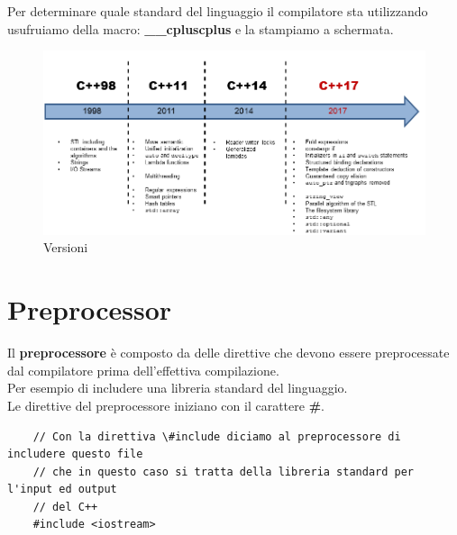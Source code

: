 \textsf{\small Per determinare quale standard del linguaggio il compilatore sta utilizzando usufruiamo della macro: \textbf{\_\_cpluscplus} e la stampiamo a schermata.} \\

\begin{figure}[H]
	\centering
	\includegraphics[width=1\textwidth, height=1\textheight, keepaspectratio]{./imgs/versions_new_in_libraries.png}
	\caption{Versioni}
	\label{fig:versions_new_in_libraries}
\end{figure}


\newpage

\section{Preprocessor}

\textsf{\small Il \textbf{preprocessore} è composto da delle direttive che devono essere preprocessate dal compilatore prima dell'effettiva compilazione.} \\

\textsf{\small Per esempio di includere una libreria standard del linguaggio.} \\

\textsf{\small Le direttive del preprocessore iniziano con il carattere \textbf{\#}.} \\

\begin{lstlisting}
	// Con la direttiva \#include diciamo al preprocessore di includere questo file
	// che in questo caso si tratta della libreria standard per l'input ed output
	// del C++
	#include <iostream> 
\end{lstlisting}


